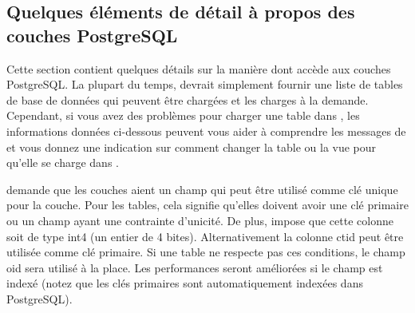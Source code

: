 \subsection{Quelques éléments de détail à propos des couches PostgreSQL} \label{sec:postgis_details}

Cette section contient quelques détails sur la manière dont \qg accède aux couches PostgreSQL. La plupart du temps, \qg devrait simplement fournir une liste de tables de base de données qui peuvent être chargées et les charges à la demande. Cependant, si vous avez des problèmes pour charger une table \psq dans \qg, les informations données ci-dessous peuvent vous aider à comprendre les messages de \qg et vous donnez une indication sur comment changer la table ou la vue \psq pour qu'elle se charge dans \qg.

\qg demande que les couches \psq aient un champ qui peut être utilisé comme clé unique pour la couche. Pour les tables, cela signifie qu'elles doivent avoir une clé primaire ou un champ ayant une contrainte d'unicité. De plus, \qg impose que cette colonne soit de type int4 (un entier de 4 bites). Alternativement la colonne ctid peut être utilisée comme clé primaire. Si une table ne respecte pas ces conditions, le champ oid sera utilisé à la place. Les performances seront améliorées si le champ est indexé (notez que les clés primaires sont automatiquement indexées dans PostgreSQL).

